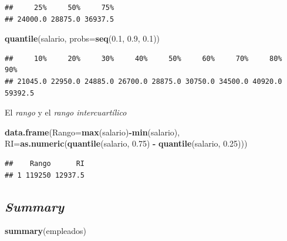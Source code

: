 \documentclass[]{book}
\newenvironment{Shaded}{\begin{snugshade}}{\end{snugshade}}
\newcommand{\KeywordTok}[1]{\textcolor[rgb]{0.13,0.29,0.53}{\textbf{#1}}}
\newcommand{\DataTypeTok}[1]{\textcolor[rgb]{0.13,0.29,0.53}{#1}}
\newcommand{\FloatTok}[1]{\textcolor[rgb]{0.00,0.00,0.81}{#1}}
\newcommand{\StringTok}[1]{\textcolor[rgb]{0.31,0.60,0.02}{#1}}
\newcommand{\OperatorTok}[1]{\textcolor[rgb]{0.81,0.36,0.00}{\textbf{#1}}}
\newcommand{\NormalTok}[1]{#1}
\begin{document}
\begin{verbatim}
##     25%     50%     75% 
## 24000.0 28875.0 36937.5
\end{verbatim}

\begin{Shaded}
\begin{Highlighting}[]
\KeywordTok{quantile}\NormalTok{(salario, }\DataTypeTok{probs=}\KeywordTok{seq}\NormalTok{(}\FloatTok{0.1}\NormalTok{, }\FloatTok{0.9}\NormalTok{, }\FloatTok{0.1}\NormalTok{))}
\end{Highlighting}
\end{Shaded}

\begin{verbatim}
##     10%     20%     30%     40%     50%     60%     70%     80%     90% 
## 21045.0 22950.0 24885.0 26700.0 28875.0 30750.0 34500.0 40920.0 59392.5
\end{verbatim}

El \emph{rango} y el \emph{rango intercuartílico}

\begin{Shaded}
\begin{Highlighting}[]
\KeywordTok{data.frame}\NormalTok{(}\DataTypeTok{Rango=}\KeywordTok{max}\NormalTok{(salario)}\OperatorTok{-}\KeywordTok{min}\NormalTok{(salario),}
           \DataTypeTok{RI=}\KeywordTok{as.numeric}\NormalTok{(}\KeywordTok{quantile}\NormalTok{(salario, }\FloatTok{0.75}\NormalTok{) }\OperatorTok{-}\StringTok{ }\KeywordTok{quantile}\NormalTok{(salario, }\FloatTok{0.25}\NormalTok{)))}
\end{Highlighting}
\end{Shaded}

\begin{verbatim}
##    Rango      RI
## 1 119250 12937.5
\end{verbatim}

\subsection{\texorpdfstring{\emph{Summary}}{Summary}}\label{summary}

\begin{Shaded}
\begin{Highlighting}[]
\KeywordTok{summary}\NormalTok{(empleados)}
\end{Highlighting}
\end{Shaded}
\end{document}
